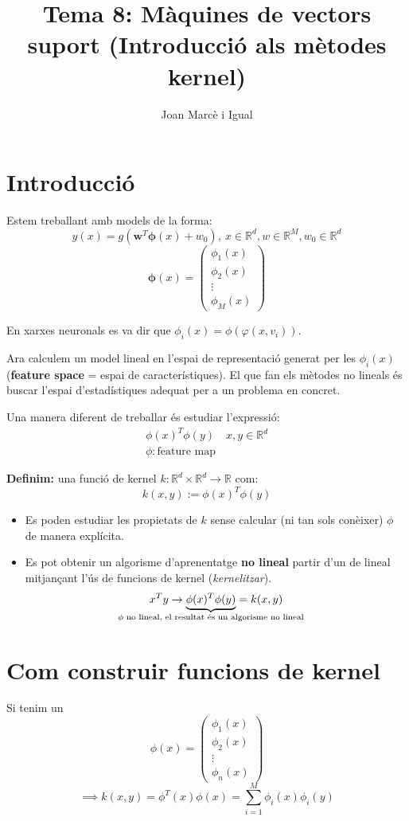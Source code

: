 \documentclass[a4paper]{article}
\title{Tema 8: Màquines de vectors suport (Introducció als mètodes kernel)}
\author{Joan Marcè i Igual}
\begin{document}
\section{Introducció}

Estem treballant amb models de la forma:
$$
y(x) = g(\boldsymbol{w}^T\boldsymbol{\phi}(x) + w_0),\ x \in \mathbb{R}^d, w \in \mathbb{R}^M, w_0 \in \mathbb{R}^d
$$
$$
\boldsymbol{\phi}(x) =
\begin{pmatrix}
\phi_1(x) \\
\phi_2(x) \\
\vdots \\
\phi_M(x)
\end{pmatrix}
$$

En xarxes neuronals es va dir que $\phi_i(x) = \phi(\varphi(x, v_i))$. 

Ara calculem un model lineal en l'espai de representació generat per les $\phi_i(x)$ (\textbf{feature space} = espai de característiques). El que fan els mètodes no lineals és buscar l'espai d'estadístiques adequat per a un problema en concret.

Una manera diferent de treballar és estudiar l'expressió:
\begin{align*}
	\phi(x)^T\phi(y) \quad x,y \in \mathbb{R}^d \\
	\phi: \text{feature map} 
\end{align*}

\textbf{Definim:} una funció de kernel $k: \mathbb{R}^d \times \mathbb{R}^d \rightarrow \mathbb{R}$ com:
$$
k(x,y) := \phi(x)^T\phi(y)
$$

\begin{itemize}
	\item Es poden estudiar les propietats de $k$ sense calcular (ni tan sols conèixer) $\phi$ de manera explícita.
	\item Es pot obtenir un algorisme d'aprenentatge \textbf{no lineal} partir d'un de lineal mitjançant l'ús de funcions de kernel (\emph{kernelitzar}).
	$$
	x^Ty \rightarrow \underbrace{\phi(x)^T\phi(y)}_{\mathclap{\text{$\phi$ no lineal, el resultat és un algorisme no lineal}}} = k(x,y)
	$$
\end{itemize}

\section{Com construir funcions de kernel}
Si tenim un 
$$
\phi(x) = 
\begin{pmatrix}
\phi_1(x)\\
\phi_2(x) \\
\vdots \\
\phi_n(x)
\end{pmatrix}
$$
$$
\implies k(x,y) = \phi^T(x)\phi(x) = \sum_{i=1}^M \phi_i(x)\phi_i(y)
$$
\end{document}
